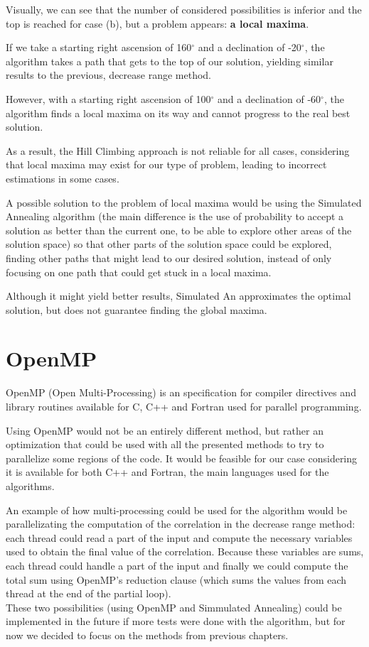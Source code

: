 Visually, we can see that the number of considered possibilities is inferior and the top is reached for case (b), but a problem appears: \textbf{a local maxima}.

If we take a starting right ascension of 160$^{\circ}$ and a declination of -20$^{\circ}$, the algorithm takes a path that gets to the top of our solution, yielding similar results to the previous, decrease range method.

However, with a starting right ascension of 100$^{\circ}$ and a declination of -60$^{\circ}$, the algorithm finds a local maxima on its way and cannot progress to the real best solution.

As a result, the Hill Climbing approach is not reliable for all cases, considering that local maxima may exist for our type of problem, leading to incorrect estimations in some cases. 


A possible solution to the problem of local maxima would be using the Simulated Annealing algorithm (the main difference is the use of probability to accept a solution as better than the current one, to be able to explore other areas of the solution space) so that other parts of the solution space could be explored, finding other paths that might lead to our desired solution, instead of only focusing on one path that could get stuck in a local maxima.

Although it might yield better results, Simulated An approximates the optimal solution, but does not guarantee finding the global maxima.

\section{OpenMP}

OpenMP (Open Multi-Processing) is an specification for compiler directives and library routines available for C, C++ and Fortran used for parallel programming.

Using OpenMP would not be an entirely different method, but rather an optimization that could be used with all the presented methods to try to parallelize some regions of the code. It would be feasible for our case considering it is available for both C++ and Fortran, the main languages used for the algorithms.

An example of how multi-processing could be used for the algorithm would be parallelizating the computation of the correlation in the decrease range method: each thread could read a part of the input and compute the necessary variables used to obtain the final value of the correlation. Because these variables are sums, each thread could handle a part of the input and finally we could compute the total sum using OpenMP's reduction clause (which sums the values from each thread at the end of the partial loop). \\

These two possibilities (using OpenMP and Simmulated Annealing) could be implemented in the future if more tests were done with the algorithm, but for now we decided to focus on the methods from previous chapters.